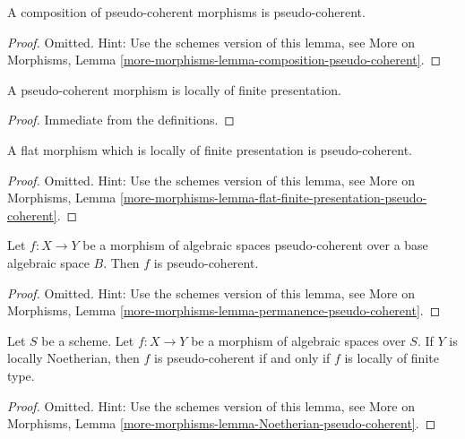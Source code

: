 \begin{lemma}
\label{lemma-composition-pseudo-coherent}
A composition of pseudo-coherent morphisms is pseudo-coherent.
\end{lemma}

\begin{proof}
Omitted. Hint: Use the schemes version of this lemma, see
More on Morphisms,
Lemma \ref{more-morphisms-lemma-composition-pseudo-coherent}.
\end{proof}

\begin{lemma}
\label{lemma-pseudo-coherent-finite-presentation}
A pseudo-coherent morphism is locally of finite presentation.
\end{lemma}

\begin{proof}
Immediate from the definitions.
\end{proof}

\begin{lemma}
\label{lemma-flat-finite-presentation-pseudo-coherent}
A flat morphism which is locally of finite presentation is pseudo-coherent.
\end{lemma}

\begin{proof}
Omitted. Hint: Use the schemes version of this lemma, see
More on Morphisms,
Lemma \ref{more-morphisms-lemma-flat-finite-presentation-pseudo-coherent}.
\end{proof}

\begin{lemma}
\label{lemma-permanence-pseudo-coherent}
Let $f : X \to Y$ be a morphism of algebraic spaces pseudo-coherent
over a base algebraic space $B$. Then $f$ is pseudo-coherent.
\end{lemma}

\begin{proof}
Omitted. Hint: Use the schemes version of this lemma, see
More on Morphisms,
Lemma \ref{more-morphisms-lemma-permanence-pseudo-coherent}.
\end{proof}

\begin{lemma}
\label{lemma-Noetherian-pseudo-coherent}
Let $S$ be a scheme. Let $f : X \to Y$ be a morphism of algebraic spaces
over $S$. If $Y$ is locally Noetherian, then $f$ is pseudo-coherent if
and only if $f$ is locally of finite type.
\end{lemma}

\begin{proof}
Omitted. Hint: Use the schemes version of this lemma, see
More on Morphisms,
Lemma \ref{more-morphisms-lemma-Noetherian-pseudo-coherent}.
\end{proof}








